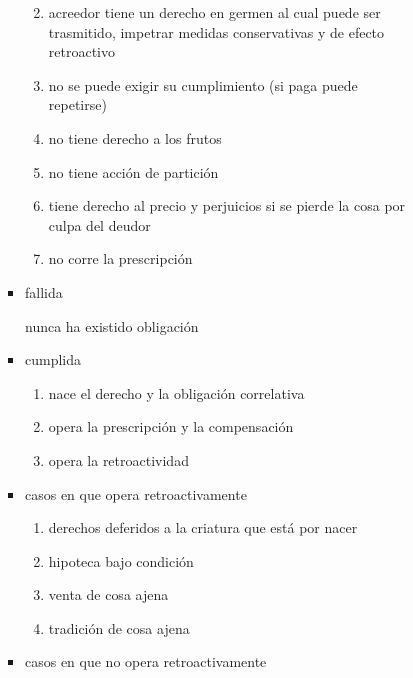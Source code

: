 \documentclass[]{article}
\providecommand{\tightlist}{%
  \setlength{\itemsep}{0pt}\setlength{\parskip}{0pt}}
\begin{document}
\begin{itemize}
\begin{itemize}
\begin{itemize}
\begin{itemize}
\begin{itemize}
          \begin{enumerate}
          \def\labelenumi{\arabic{enumi}.}
          \tightlist
          \item
            acreedor tiene un derecho en germen al cual puede ser
            trasmitido, impetrar medidas conservativas y de efecto
            retroactivo
          \item
            no se puede exigir su cumplimiento (si paga puede repetirse)
          \item
            no tiene derecho a los frutos
          \item
            no tiene acción de partición
          \item
            tiene derecho al precio y perjuicios si se pierde la cosa
            por culpa del deudor
          \item
            no corre la prescripción
          \end{enumerate}
        \item
          fallida

          nunca ha existido obligación
        \item
          cumplida

          \begin{enumerate}
          \def\labelenumi{\arabic{enumi}.}
          \tightlist
          \item
            nace el derecho y la obligación correlativa
          \item
            opera la prescripción y la compensación
          \item
            opera la retroactividad
          \end{enumerate}
        \item
          casos en que opera retroactivamente

          \begin{enumerate}
          \def\labelenumi{\arabic{enumi}.}
          \tightlist
          \item
            derechos deferidos a la criatura que está por nacer
          \item
            hipoteca bajo condición
          \item
            venta de cosa ajena
          \item
            tradición de cosa ajena
          \end{enumerate}
        \item
          casos en que no opera retroactivamente


\end{itemize}
\end{itemize}
\end{itemize}
\end{itemize}
\end{itemize}
\end{document}
